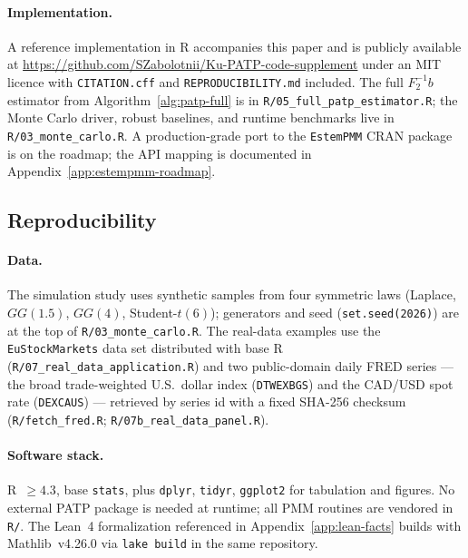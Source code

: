 \documentclass[11pt]{article}
\def\mathbf#1{#1}%
\def\mathrm#1{#1}%
\theoremstyle{definition}
\providecommand{\proglang}[1]{\textsf{#1}}
\begin{document}
\paragraph{Implementation.}
A reference implementation in R accompanies this paper and is publicly
available at
\url{https://github.com/SZabolotnii/Ku-PATP-code-supplement}
under an MIT licence with \texttt{CITATION.cff} and
\texttt{REPRODUCIBILITY.md} included. The full
$\mathbf{F}_2^{-1}\mathbf{b}$ estimator from Algorithm~\ref{alg:patp-full}
is in \texttt{R/05\_full\_patp\_estimator.R}; the Monte Carlo driver,
robust baselines, and runtime benchmarks live in
\texttt{R/03\_monte\_carlo.R}. A production-grade port to the
\texttt{EstemPMM} CRAN package~\citep{zabolotnii2024nonlinear,
zabolotnii2026estempmmcran} is on the roadmap; the API mapping is
documented in Appendix~\ref{app:estempmm-roadmap}.

\subsection{Reproducibility}\label{sec:alg:repro}

\paragraph{Data.}
The simulation study uses synthetic samples from four symmetric laws
(Laplace, $\mathrm{GG}(1.5)$, $\mathrm{GG}(4)$, Student-$t(6)$); generators and
seed (\texttt{set.seed(2026)}) are at the top of \texttt{R/03\_monte\_carlo.R}.
The real-data examples use the \texttt{EuStockMarkets} data set distributed with
base \proglang{R} (\texttt{R/07\_real\_data\_application.R}) and two public-domain
daily FRED series --- the broad trade-weighted U.S.\ dollar index
(\texttt{DTWEXBGS}) and the CAD/USD spot rate (\texttt{DEXCAUS}) --- retrieved by
series id with a fixed SHA-256 checksum (\texttt{R/fetch\_fred.R};
\texttt{R/07b\_real\_data\_panel.R}).

\paragraph{Software stack.}
R~$\geq 4.3$, base \texttt{stats}, plus \texttt{dplyr}, \texttt{tidyr},
\texttt{ggplot2} for tabulation and figures. No external PATP package is
needed at runtime; all PMM routines are vendored in \texttt{R/}. The
Lean~4 formalization referenced in Appendix~\ref{app:lean-facts} builds
with Mathlib~v4.26.0 via \texttt{lake build} in the same repository.
\end{document}
